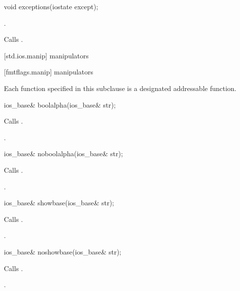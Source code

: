 %
\begin{itemdecl}
void exceptions(iostate except);
\end{itemdecl}

\begin{itemdescr}
\pnum
\ensures
{}.

\pnum
\effects
Calls
.
\end{itemdescr}

[std.ios.manip]{ manipulators}

[fmtflags.manip]{ manipulators}

\pnum
Each function specified in this subclause
is a designated addressable function.

%
\begin{itemdecl}
ios_base& boolalpha(ios_base& str);
\end{itemdecl}

\begin{itemdescr}
\pnum
\effects
Calls
.

\pnum
\returns
{}.
\end{itemdescr}

%
\begin{itemdecl}
ios_base& noboolalpha(ios_base& str);
\end{itemdecl}

\begin{itemdescr}
\pnum
\effects
Calls
.

\pnum
\returns
{}.
\end{itemdescr}

%
\begin{itemdecl}
ios_base& showbase(ios_base& str);
\end{itemdecl}

\begin{itemdescr}
\pnum
\effects
Calls
.

\pnum
\returns
{}.
\end{itemdescr}

%
\begin{itemdecl}
ios_base& noshowbase(ios_base& str);
\end{itemdecl}

\begin{itemdescr}
\pnum
\effects
Calls
.

\pnum
\returns
{}.
\end{itemdescr}

